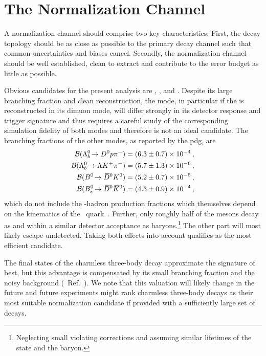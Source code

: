 \chapter{The Normalization Channel \texorpdfstring{\decay{\Lb}{\Dz\proton\pim}}{Λb → Dpπ}}
\label{chap:norm}
A normalization channel should comprise two key characteristics: First, the decay topology should be as close as possible to the primary decay channel such that common uncertainties and biases cancel.
Secondly, the normalization channel should be well established, clean to extract and contribute to the error budget as little as possible.

Obvious candidates for the present analysis are \decay{\Lb}{\Dz\proton\pim}, \decay{\Lb}{\Lz\Kp\pim}, \decay{\Lb}{\jpsi\Lz} and .
Despite its large branching fraction and clean reconstruction, the \jpsi\Lz mode, in particular if the \jpsi is reconstructed in its dimuon mode, will differ strongly in its detector response and trigger signature and thus requires a careful study of the corresponding simulation fidelity of both modes and therefore is not an ideal candidate.
The branching fractions of the other modes, as reported by the \gls{pdg}, are
\begin{align*}
    {\ensuremath{\mathcal{B}}}({{\Lambda}^0_{b}}\!\rightarrow {\ensuremath{{D}^0}}{\ensuremath{p}}{\ensuremath{{\pi}^-}}) &= (6.3 \pm 0.7) \times 10^{-4} \,, \\
    {\mathcal{B}}({{\Lambda}^0_{b}}\!\rightarrow {\ensuremath{\Lambda}}{\ensuremath{{K}^+}}{\ensuremath{{\pi}^-}}) &= (5.7 \pm 1.3) \times 10^{-6} \,, \\
    {\mathcal{B}}({{B}^0}\!\rightarrow {\ensuremath{{\kern 0.2em\overline{\kern -0.2em D}{}}{}^0}}{\ensuremath{{K}^0}}) &= (5.2 \pm 0.7) \times 10^{-5} \,, \\
    {\mathcal{B}}({{B}^0_{s}}\!\rightarrow {\ensuremath{{\kern 0.2em\overline{\kern -0.2em D}{}}{}^0}}{\ensuremath{{\kern 0.2em\overline{\kern -0.2em K}{}}{}^0}}) &= (4.3 \pm 0.9) \times 10^{-4} \,,
\end{align*}
which do not include the \bquark-hadron production fractions which themselves depend on the kinematics of the \bquark~quark~\cite{LHCb_bProdFrac_7,LHCb_bProdFrac_13}.
Further, only roughly half of the \Kz mesons decay as \KS and within a similar detector acceptance as \Lz baryons.\footnote{Neglecting small \CP{} violating corrections and assuming similar lifetimes of the \KS state and the \Lz baryon.}
The other part will most likely escape undetected.
Taking both effects into account qualifies \decay{\Lb}{\Dz\proton\pim} as the most efficient candidate.

The final states of the charmless three-body decay approximate the signature of \decay{\Lb}{\Dz\Lz} best, but this advantage is compensated by its small branching fraction and the noisy background (\cf{}~Ref.~\cite{LbToLzhh}).
We note that this valuation will likely change in the future and future experiments might rank charmless three-body decays as their most suitable normalization candidate if provided with a sufficiently large set of \Lb decays.

